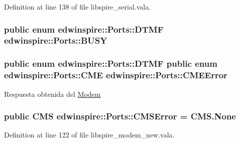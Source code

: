 Definition at line 138 of file libspire\-\_\-serial.\-vala.

\hypertarget{namespaceedwinspire_1_1Ports_a429529c9b9db1b911c77e8d48f19cf1f}{
\subsubsection[{B\-U\-S\-Y}]{\setlength{\rightskip}{0pt plus 5cm}public enum {\bf edwinspire\-::\-Ports\-::\-D\-T\-M\-F}
			 edwinspire\-::\-Ports\-::\-B\-U\-S\-Y}}\label{namespaceedwinspire_1_1Ports_a429529c9b9db1b911c77e8d48f19cf1f}
\hypertarget{namespaceedwinspire_1_1Ports_a74ee8bbe692036a9613256844c74bb50}{
\subsubsection[{C\-M\-E\-Error}]{\setlength{\rightskip}{0pt plus 5cm}public enum {\bf edwinspire\-::\-Ports\-::\-D\-T\-M\-F} public enum {\bf edwinspire\-::\-Ports\-::\-C\-M\-E} edwinspire\-::\-Ports\-::\-C\-M\-E\-Error}}\label{namespaceedwinspire_1_1Ports_a74ee8bbe692036a9613256844c74bb50}


Respuesta obtenida del \hyperlink{classedwinspire_1_1Ports_1_1Modem}{Modem} 

\hypertarget{namespaceedwinspire_1_1Ports_ac087f2314d763ec62e02b62df2b34571}{
\subsubsection[{C\-M\-S\-Error}]{\setlength{\rightskip}{0pt plus 5cm}public {\bf C\-M\-S} edwinspire\-::\-Ports\-::\-C\-M\-S\-Error = C\-M\-S.\-None}}\label{namespaceedwinspire_1_1Ports_ac087f2314d763ec62e02b62df2b34571}


Definition at line 122 of file libspire\-\_\-modem\-\_\-new.\-vala.

